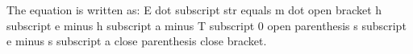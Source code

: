 The equation is written as:  
E dot subscript str equals m dot open bracket h subscript e minus h subscript a minus T subscript 0 open parenthesis s subscript e minus s subscript a close parenthesis close bracket.